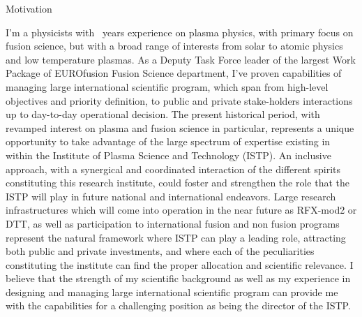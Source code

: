 \begin{cvblock}{Motivation}
\end{cvblock}
I'm a physicists with \FPtrunc{}\mydegree\ years
experience on plasma physics, with primary focus on fusion science, but with a
broad range of interests from solar to atomic physics and low
temperature plasmas. As a Deputy Task Force leader of the largest Work
Package of EUROfusion Fusion Science department, I've proven capabilities of managing large
international scientific program, which span from high-level objectives and
priority definition, to public and private stake-holders interactions 
up to day-to-day operational decision.
The present historical period, with revamped interest on plasma and 
fusion science in particular, represents a unique opportunity to take
advantage of the large spectrum of expertise existing in within the Institute of Plasma Science
and Technology (ISTP). An inclusive approach, with a synergical and coordinated interaction of
the different spirits
constituting this research institute, could foster and
strengthen the role that the ISTP will play in future national and
international endeavors. Large research infrastructures which will come
into operation in the near future as RFX-mod2 or DTT,  as well as
participation to international fusion and non fusion programs
represent the natural framework where ISTP can play a leading role,
attracting both public and private investments,  and
where each of the peculiarities constituting the institute can find the
proper allocation and scientific relevance. I believe that the strength
of my scientific background as well as my experience in designing and
managing large international scientific program can provide me with
the capabilities for a challenging position as being the director of the ISTP.

